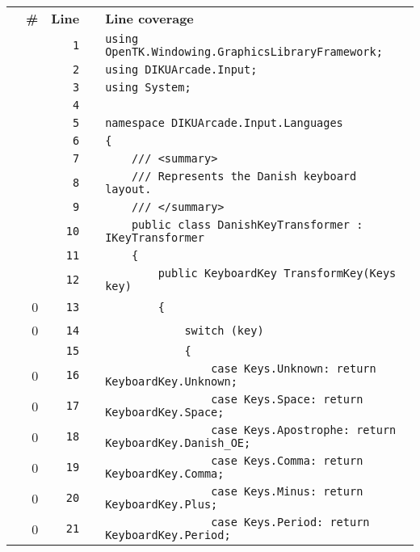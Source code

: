 \documentclass[a4paper,landscape,10pt]{article}
\begin{document}
\begin{longtable}[l]{lrrll}
\textbf{} & \textbf{\#} & \textbf{Line} & \textbf{} & \textbf{Line coverage}\\
\cellcolor{gray} &  & \verb~1~ & & \verb~using OpenTK.Windowing.GraphicsLibraryFramework;~\\
\cellcolor{gray} &  & \verb~2~ & & \verb~using DIKUArcade.Input;~\\
\cellcolor{gray} &  & \verb~3~ & & \verb~using System;~\\
\cellcolor{gray} &  & \verb~4~ & & \verb~~\\
\cellcolor{gray} &  & \verb~5~ & & \verb~namespace DIKUArcade.Input.Languages~\\
\cellcolor{gray} &  & \verb~6~ & & \verb~{~\\
\cellcolor{gray} &  & \verb~7~ & & \verb~    /// <summary>~\\
\cellcolor{gray} &  & \verb~8~ & & \verb~    /// Represents the Danish keyboard layout.~\\
\cellcolor{gray} &  & \verb~9~ & & \verb~    /// </summary>~\\
\cellcolor{gray} &  & \verb~10~ & & \verb~    public class DanishKeyTransformer : IKeyTransformer~\\
\cellcolor{gray} &  & \verb~11~ & & \verb~    {~\\
\cellcolor{gray} &  & \verb~12~ & & \verb~        public KeyboardKey TransformKey(Keys key)~\\
\cellcolor{red} & 0 & \verb~13~ & & \verb~        {~\\
\cellcolor{red} & 0 & \verb~14~ & & \verb~            switch (key)~\\
\cellcolor{gray} &  & \verb~15~ & & \verb~            {~\\
\cellcolor{red} & 0 & \verb~16~ & & \verb~                case Keys.Unknown: return KeyboardKey.Unknown;~\\
\cellcolor{red} & 0 & \verb~17~ & & \verb~                case Keys.Space: return KeyboardKey.Space;~\\
\cellcolor{red} & 0 & \verb~18~ & & \verb~                case Keys.Apostrophe: return KeyboardKey.Danish_OE;~\\
\cellcolor{red} & 0 & \verb~19~ & & \verb~                case Keys.Comma: return KeyboardKey.Comma;~\\
\cellcolor{red} & 0 & \verb~20~ & & \verb~                case Keys.Minus: return KeyboardKey.Plus;~\\
\cellcolor{red} & 0 & \verb~21~ & & \verb~                case Keys.Period: return KeyboardKey.Period;~\\

\end{longtable}
\end{document}
